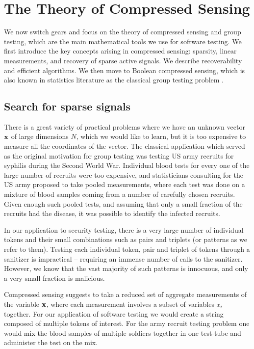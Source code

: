 \section{The Theory of Compressed Sensing}

We now switch gears and focus on the theory of compressed sensing and group testing, which are the main mathematical tools we use for software testing. We first introduce the key concepts arising in compressed sensing: sparsity, linear measurements, and recovery of sparse active signals. We describe recoverability and efficient algorithms. We then move to Boolean compressed sensing, which is also known in statistics literature as the classical group testing problem \cite{dorfman1943detection, group_testing}. 


\subsection{Search for sparse signals}

There is a great variety of practical problems where we have an unknown vector $\mathbf{x}$
of large dimensions $N$, which we would like to learn, but it is too expensive to measure all
the coordinates of the vector. The classical application which served as the original motivation
for group testing was testing US army recruits for syphilis during the Second World War. 
Individual blood tests for every one of the large number of recruits were too expensive, 
and statisticians consulting for the US army proposed to take pooled measurements, where 
each test was done on a mixture of blood samples coming from a number of carefully chosen 
recruits. Given enough such pooled tests, and assuming that only a small fraction of the 
recruits had the disease, it was possible to identify the infected recruits.  


In our application to security testing, there is a very large number of individual tokens and 
their small combinations such as pairs and triplets (or patterns as we refer to them). Testing each individual token, pair and 
triplet of tokens through a sanitizer is impractical -- requiring an immense number of calls to the 
sanitizer. However, we know that the vast majority of such patterns is innocuous, 
and only a very small fraction is malicious. 

Compressed sensing suggests to take a reduced set of aggregate measurements of the variable $\mathbf{x}$,
where each measurement involves a subset of variables $x_i$ together.  For our application of
software testing we would create a string composed of multiple tokens of interest.  For the
army recruit testing problem one would mix the blood samples of multiple soldiers together
in one test-tube and administer the test on the mix.


